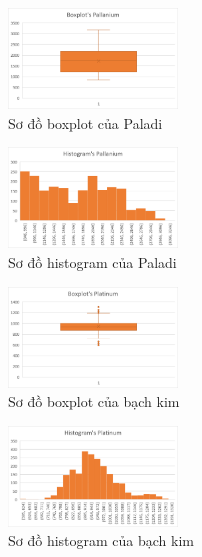 \begin{figure}[htbp]
\centerline{\includegraphics[width=0.4\textwidth]{img/Picture3.png}}
\caption{Sơ đồ boxplot của Paladi}
\label{fig}
\end{figure}

\begin{figure}[htbp]
\centerline{\includegraphics[width=0.4\textwidth]{img/Picture6.png}}
\caption{Sơ đồ histogram của Paladi}
\label{fig}
\end{figure}

\begin{figure}[htbp]
\centerline{\includegraphics[width=0.4\textwidth]{img/Picture4.png}}
\caption{Sơ đồ boxplot của bạch kim}
\label{fig}
\end{figure}

\begin{figure}[htbp]
\centerline{\includegraphics[width=0.4\textwidth]{img/Picture7.png}}
\caption{Sơ đồ histogram của bạch kim}
\label{fit}
\end{figure}
